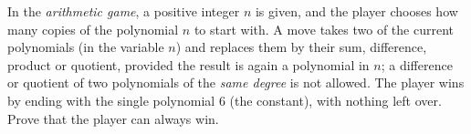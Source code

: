 In the \emph{arithmetic game}, a positive integer $n$ is given, and the player chooses how many copies of the polynomial $n$ to start with. A move takes two of the current polynomials (in the variable $n$) and replaces them by their sum, difference, product or quotient, provided the result is again a polynomial in $n$; a difference or quotient of two polynomials of the \emph{same degree} is not allowed. The player wins by ending with the single polynomial $6$ (the constant), with nothing left over. Prove that the player can always win.
